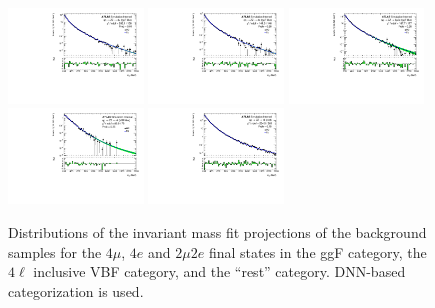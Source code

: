 \begin{figure}[htbp]
    \centering
    \includegraphics[width=0.32\textwidth]{figures/HMHZZ/background/dnn/bkg_shape_qqZZ_ggF_4mu_190_to_2200_log.pdf}
    \includegraphics[width=0.32\textwidth]{figures/HMHZZ/background/dnn/bkg_shape_qqZZ_ggF_4e_190_to_2200_log.pdf}
    \includegraphics[width=0.32\textwidth]{figures/HMHZZ/background/dnn/bkg_shape_qqZZ_ggF_2mu2e_190_to_2200_log.pdf} \\
    \includegraphics[width=0.32\textwidth]{figures/HMHZZ/background/dnn/bkg_shape_qqZZ_VBF_incl_190_to_2200_log.pdf}
    \includegraphics[width=0.32\textwidth]{figures/HMHZZ/background/dnn/bkg_shape_qqZZ_rest_190_to_2200_log.pdf}
    \caption{Distributions of the \mfl invariant mass fit projections of the \qqZZ background samples for the $4\mu$,
    $4e$ and $2\mu 2e$ final states in the ggF category, the $4\ell$ inclusive VBF category, and the ``rest'' category.
    DNN-based categorization is used.} 
    \label{fig:qqZZ_m4l_shape_all_DNN}
\end{figure}

